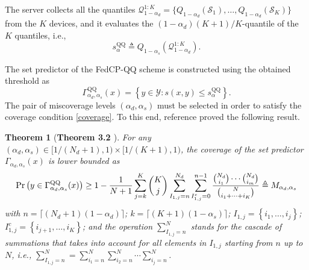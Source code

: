 \documentclass[12pt, draftclsnofoot, onecolumn]{IEEEtran}
\newtheorem{theorem}{Theorem}
\begin{document}
The server collects all the quantiles $\mathcal{Q}^{1:K}_{1-\alpha_d}=\{Q_{1-\alpha_d}\left(\mathcal{S}_1\right), \ldots, Q_{1-\alpha_d}\left(\mathcal{S}_K\right)\}$ from the $K$ devices, and it evaluates the $(1-\alpha_d)(K+1)/K$-quantile of the $K$ quantiles, i.e.,
\begin{equation}\label{QQ estimator}
    s^{\textrm{QQ}}_\alpha \triangleq Q_{1-\alpha_s}(\mathcal{Q}^{1:K}_{1-\alpha_d}).
\end{equation}

The set predictor of the FedCP-QQ scheme is constructed using the obtained threshold as
\begin{equation}\label{FedCP-QQ set predictor}
    \Gamma_{\alpha_d,\alpha_s}^{\text{QQ}}(x) = \left\{y\in\mathcal{Y}: s(x,y)\leq s^{\textrm{QQ}}_\alpha\right\}.
\end{equation} 
The pair of miscoverage levels $(\alpha_d, \alpha_s)$ must be selected in order to satisfy the coverage condition \eqref{coverage}. To this end, reference \cite{FedCP-QQ} proved the following result.


\begin{theorem}[\textbf{Theorem 3.2 \cite{FedCP-QQ}}]%
    \label{theorem_FedCPQQ}
    For any $(\alpha_d,\alpha_s)\in[1/(N_d+1),1)\times[1/(K+1),1)$, the coverage of the set predictor $\Gamma_{\alpha_d,\alpha_s}(x)$ is lower bounded as
    \begin{align}\label{M_nk}
        \Pr\left(y \in \Gamma_{\alpha_d,\alpha_s}^{\text{\rm{QQ}}}(x)\right) \geq 1 - \frac{1}{N + 1}\sum_{j=k}^K\binom{K}{j}\sum_{I_{1, j}=n}^{N_d}\sum_{I_{1, j}^c=0}^{n-1}\frac{\binom{N_d}{i_1}\cdots{\binom{N_d}{i_m}}}{\binom{N}{i_1+\cdots+i_K}}\triangleq M_{\alpha_d,\alpha_s}
    \end{align}
    with $n = \lceil (N_d+1)(1-\alpha_d)\rceil$; $k = \lceil (K+1)(1-\alpha_s)\rceil$;  $I_{1, j}=\left\{i_1, \ldots, i_j\right\}$; $I_{1, j}^c=\left\{i_{j+1}, \ldots, i_K\right\}$; and the operation $\sum_{I_{1,j}=n}^{N}$ stands for the cascade of summations that takes into account for all elements in $I_{1,j}$ starting from $n$ up to $N$, i.e., $\sum_{I_{1,j}=n}^{N}= \sum_{i_1=n}^N \sum_{i_2=n}^N \cdots \sum_{i_j=n}^N$.
\end{theorem}
\end{document}
